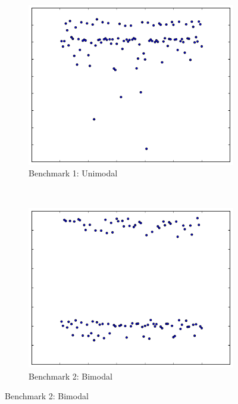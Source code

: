 \documentclass[conference]{IEEEtran}
\begin{document}
\begin{figure}
\centering

\begin{subfigure}{0.22\textwidth}
    \centering
    \includegraphics[width=\textwidth]{figures/fig1/simple_branchsum_fast}
    \caption{Benchmark 1: Unimodal}
\end{subfigure}%
~
\begin{subfigure}{0.22\textwidth}
    \centering
    \includegraphics[width=\textwidth]{figures/fig1/bimodal_branchsum}
    \caption{Benchmark 2: Bimodal}
\end{subfigure}


\end{figure}
\end{document}
